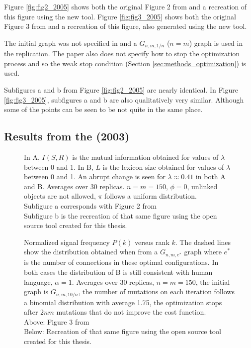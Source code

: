 Figure \ref{fig:fig2_2005} shows both the original Figure 2 from \cite{Ferrer2005a} and a recreation of this figure using the new tool.
Figure \ref{fig:fig3_2005} shows both the original Figure 3 from \cite{Ferrer2005a} and a recreation of this figure, also generated using the new tool.

The initial graph was not specified in \cite{Ferrer2005a} and a $G_{n,m,1/n}$ ($n=m$) graph is used in the replication.
The paper also does not specify how to stop the optimization process and so the weak stop condition (Section \ref{sec:methods_optimization}) is used.

Subfigures a and b from Figure \ref{fig:fig2_2005} are nearly identical.
In Figure \ref{fig:fig3_2005}, subfigures a and b are also qualitatively very similar.
Although some of the points can be seen to be not quite in the same place.

\subsection{Results from the \secondmodel{} (2003)}
\label{sec:results_verification_second}

\begin{figure}
  \caption{
    In A, $I(S,R)$ is the mutual information obtained for values of $\lambda$ between 0 and 1.
    In B, $L$ is the lexicon size obtained for values of $\lambda$ between 0 and 1.
    An abrupt change is seen for $\lambda \approx 0.41$ in both A and B.
    Averages over 30 replicas.
    $n=m=150$, $\phi=0$, unlinked objects are not allowed, $\pi$ follows a uniform distribution.\\
    Subfigure a corresponds with Figure 2 from \cite{Ferrer2003a}\\
    Subfigure b is the recreation of that same figure using the open source tool created for this thesis.
  }
  \label{fig:fig2_2003}
\end{figure}

\begin{figure}
  \caption{
    Normalized signal frequency $P(k)$ versus rank $k$.
    The dashed lines show the distribution obtained when from a $G_{n,m,e^*}$ graph where $e^*$ is the number of connections in these optimal configurations.
    In both cases the distribution of B is still consistent with human language, $\alpha=1$.
    Averages over 30 replicas, $n=m=150$, the initial graph is $G_{n,m,10/n}$, the number of mutations on each iteration follows a binomial distribution with average 1.75, the optimization stops after $2nm$ mutations that do not improve the cost function.\\
    Above: Figure 3 from \cite{Ferrer2003a}\\
    Below: Recreation of that same figure using the open source tool created for this thesis.
  }
  \label{fig:fig3_2003}
\end{figure}

